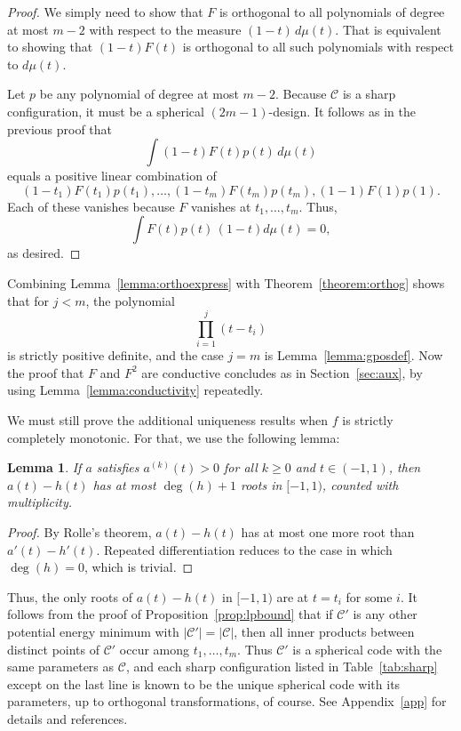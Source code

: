 \documentclass{jams-l}
\theoremstyle{plain}
\newtheorem{lemma}[theorem]{Lemma}
\numberwithin{theorem}{section}
\theoremstyle{definition}
\numberwithin{equation}{section}
\newcommand{\CodeS}{\mathcal{C}}
\newcommand{\CodeT}{\mathcal{C}'}
\begin{document}
\begin{proof}
We simply need to show that $F$ is orthogonal to all polynomials
of degree at most $m-2$ with respect to the measure $(1-t)
\,d\mu(t)$.  That is equivalent to showing that $(1-t)F(t)$ is
orthogonal to all such polynomials with respect to $d\mu(t)$.

Let $p$ be any polynomial of degree at most $m-2$.  Because
$\CodeS$ is a sharp configuration, it must be a spherical
$(2m-1)$-design.  It follows as in the previous proof that
$$
\int (1-t)F(t) p(t) \, d\mu(t)
$$
equals a positive linear combination of
$$
(1-t_1)F(t_1) p(t_1),\dots,(1-t_m)F(t_m) p(t_m),(1-1)F(1) p(1).
$$
Each of these vanishes because $F$ vanishes at $t_1,\dots,t_m$.
Thus,
$$
\int F(t) p(t) \, (1-t)d\mu(t) = 0,
$$
as desired.
\end{proof}

Combining Lemma~\ref{lemma:orthoexpress} with
Theorem~\ref{theorem:orthog} shows that for $j < m$, the
polynomial
$$
\prod_{i=1}^j (t-t_i)
$$
is strictly positive definite, and the case $j=m$ is
Lemma~\ref{lemma:gposdef}. Now the proof that $F$ and $F^2$ are
conductive concludes as in Section~\ref{sec:aux}, by using
Lemma~\ref{lemma:conductivity} repeatedly.

We must still prove the additional uniqueness results when $f$ is
strictly completely monotonic.  For that, we use the following
lemma:

\begin{lemma}
If $a$ satisfies $a^{(k)}(t) > 0$ for all $k \ge 0$ and $t \in
(-1,1)$, then $a(t)-h(t)$ has at most $\deg(h)+1$ roots in
$[-1,1)$, counted with multiplicity.
\end{lemma}

\begin{proof}
By Rolle's theorem, $a(t)-h(t)$ has at most one more root than
$a'(t)-h'(t)$.  Repeated differentiation reduces to the case in
which $\deg(h)=0$, which is trivial.
\end{proof}

Thus, the only roots of $a(t)-h(t)$ in $[-1,1)$ are at $t=t_i$ for
some $i$. It follows from the proof of
Proposition~\ref{prop:lpbound} that if $\CodeT$ is any other
potential energy minimum with $|\CodeT|=|\CodeS|$, then all inner
products between distinct points of $\CodeT$ occur among
$t_1,\dots,t_m$. Thus $\CodeT$ is a spherical code with the same
parameters as $\CodeS$, and each sharp configuration listed in
Table~\ref{tab:sharp} except on the last line is known to be the
unique spherical code with its parameters, up to orthogonal
transformations, of course. See Appendix~\ref{app} for details and
references.
\end{document}
